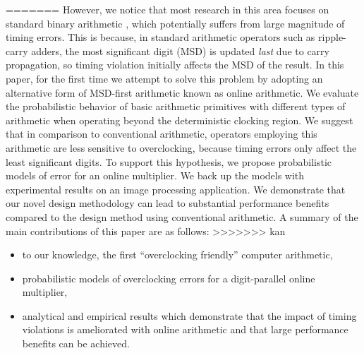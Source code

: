 \documentclass{acm_proc_article-sp}
\begin{document}
=======
However, we notice that most research in this area focuses on standard binary arithmetic \cite{Gupta2013TransCADICS,NonUniformScaling,Undersigned2x2multiplier}, which potentially suffers from large magnitude of timing errors. This is because, in standard arithmetic operators such as ripple-carry adders, the most significant digit (MSD) is updated \emph{last} due to carry propagation, so timing violation initially affects the MSD of the result. In this paper, for the first time we attempt to solve this problem by adopting an alternative form of MSD-first arithmetic known as online arithmetic. We evaluate the probabilistic behavior of basic arithmetic primitives with different types of arithmetic when operating beyond the deterministic clocking region. We suggest that in comparison to conventional arithmetic, operators employing this arithmetic are less sensitive to overclocking, because timing errors only affect the least significant digits. To support this hypothesis, we propose probabilistic models of error for an online multiplier. We back up the models with experimental results on an image processing application. We demonstrate that our novel design methodology can lead to substantial performance benefits compared to the design method using conventional arithmetic. A summary of the main contributions of this paper are as follows:
>>>>>>> kan
%
\begin{itemize}
\vspace{-2ex}
  \item to our knowledge, the first ``overclocking friendly'' computer arithmetic,\vspace{-.7ex}
  \item probabilistic models of overclocking errors for a digit-parallel online multiplier,\vspace{-.7ex}
  \item analytical and empirical results which demonstrate that the impact of timing violations is ameliorated with online arithmetic and that large performance benefits can be achieved.\vspace{-.7ex}
\end{itemize}



\end{document}
